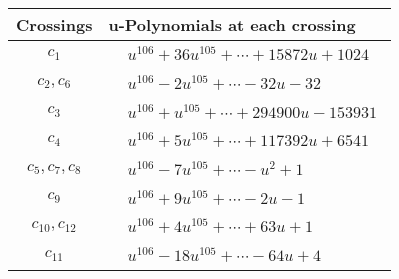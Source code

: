 \documentclass[1p]{elsarticle_modified}
\theoremstyle{definition}
\begin{document}
\begin{tabular}{m{50pt}|m{274pt}}
Crossings & \hspace{64pt}u-Polynomials at each crossing \\
\hline $$\begin{aligned}c_{1}\end{aligned}$$&$\begin{aligned}
&u^{106}+36 u^{105}+\cdots+15872 u+1024
\end{aligned}$\\
\hline $$\begin{aligned}c_{2},c_{6}\end{aligned}$$&$\begin{aligned}
&u^{106}-2 u^{105}+\cdots-32 u-32
\end{aligned}$\\
\hline $$\begin{aligned}c_{3}\end{aligned}$$&$\begin{aligned}
&u^{106}+u^{105}+\cdots+294900 u-153931
\end{aligned}$\\
\hline $$\begin{aligned}c_{4}\end{aligned}$$&$\begin{aligned}
&u^{106}+5 u^{105}+\cdots+117392 u+6541
\end{aligned}$\\
\hline $$\begin{aligned}c_{5},c_{7},c_{8}\end{aligned}$$&$\begin{aligned}
&u^{106}-7 u^{105}+\cdots- u^2+1
\end{aligned}$\\
\hline $$\begin{aligned}c_{9}\end{aligned}$$&$\begin{aligned}
&u^{106}+9 u^{105}+\cdots-2 u-1
\end{aligned}$\\
\hline $$\begin{aligned}c_{10},c_{12}\end{aligned}$$&$\begin{aligned}
&u^{106}+4 u^{105}+\cdots+63 u+1
\end{aligned}$\\
\hline $$\begin{aligned}c_{11}\end{aligned}$$&$\begin{aligned}
&u^{106}-18 u^{105}+\cdots-64 u+4
\end{aligned}$\\
\hline
\end{tabular}\\~\\
\end{document}
